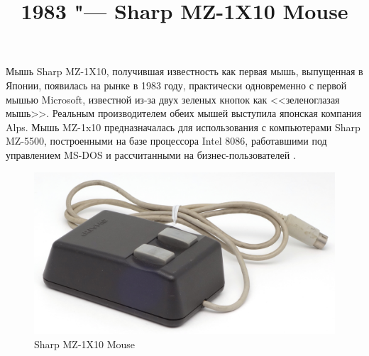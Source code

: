 \documentclass[11pt, a4paper]{article}
\begin{document}
\title{1983 "--- Sharp MZ-1X10 Mouse}
\date{}
\maketitle
{}

Мышь Sharp MZ-1X10, получившая известность как первая мышь, выпущенная в Японии, появилась на рынке в 1983 году, практически одновременно с первой мышью Microsoft, известной из-за двух зеленых кнопок как <<зеленоглазая мышь>>. Реальным производителем обеих мышей выступила японская компания Alps. Мышь MZ-1x10 предназначалась для использования с компьютерами Sharp MZ-5500, построенными на базе процессора Intel 8086, работавшими под управлением MS-DOS и рассчитанными на бизнес-пользователей \cite{review, wiki}.

\begin{figure}[h]
   \centering
    \includegraphics[scale=0.7]{1983_sharp_mz_1x10_mouse/pic_30.jpg}
    \caption{Sharp MZ-1X10 Mouse}
    \label{fig:SharpMZ1x10Pic}
\end{figure}
\end{document}
